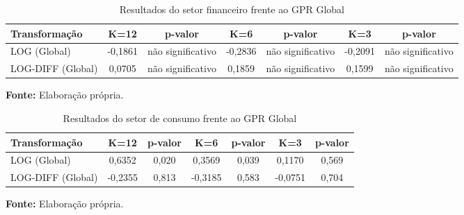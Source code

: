 \clearpage


\begin{table}[H]
\centering
\caption{Resultados do setor financeiro frente ao GPR Global}
\label{tab:setor-financeiro-gpr-global}
\small
\begin{adjustbox}{max width=\textwidth}
\begin{tabular}{@{}lcccccc@{}}
\toprule
Transformação & K=12 & p-valor & K=6 & p-valor & K=3 & p-valor \\
\midrule
LOG (Global) & -0,1861 & não significativo & -0,2836 & não significativo & -0,2091 & não significativo \\
LOG-DIFF (Global) & 0,0705 & não significativo & 0,1859 & não significativo & 0,1599 & não significativo \\
\bottomrule
\end{tabular}
\end{adjustbox}
\vspace{1mm}
\begin{minipage}{\textwidth}
\footnotesize
\textbf{Fonte:} Elaboração própria.
\end{minipage}
\end{table}

\begin{table}[H]
\centering
\caption{Resultados do setor de consumo frente ao GPR Global}
\label{tab:setor-consumo-gpr-global-resumo}
\small
\begin{adjustbox}{max width=\textwidth}
\begin{tabular}{@{}lcccccc@{}}
\toprule
Transformação & K=12 & p-valor & K=6 & p-valor & K=3 & p-valor \\
\midrule
LOG (Global) & 0,6352 & 0,020 & 0,3569 & 0,039 & 0,1170 & 0,569 \\
LOG-DIFF (Global) & -0,2355 & 0,813 & -0,3185 & 0,583 & -0,0751 & 0,704 \\
\bottomrule
\end{tabular}
\end{adjustbox}
\vspace{1mm}
\begin{minipage}{\textwidth}
\footnotesize
\textbf{Fonte:} Elaboração própria.
\end{minipage}
\end{table}


